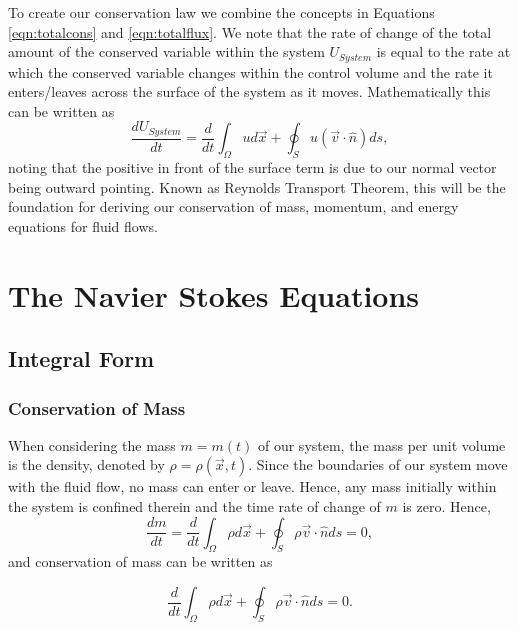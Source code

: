 To create our conservation law we combine the concepts in Equations \ref{eqn:totalcons} and \ref{eqn:totalflux}. We note that the rate of change of the total amount of the conserved variable within the system $U_{System}$ is equal to the rate at which the conserved variable changes within the control volume and the rate it enters/leaves across the surface of the system as it moves. Mathematically this can be written as
\begin{equation}
	\frac{dU_{System}}{dt} = \frac{d}{dt}\int_\Omega u d\vec{x} + \oint_S u (\vec{v} \cdot \hat{n}) ds,
\end{equation}
noting that the positive in front of the surface term is due to our normal vector being outward pointing. Known as Reynolds Transport Theorem, this will be the foundation for deriving our conservation of mass, momentum, and energy equations for fluid flows.

\chapter{The Navier Stokes Equations}

\section{Integral Form}
\subsection{Conservation of Mass}
When considering the mass $m = m(t)$ of our system, the mass per unit volume is the density, denoted by $\rho = \rho(\vec{x},t)$. Since the boundaries of our system move with the fluid flow, no mass can enter or leave. Hence, any mass initially within the system is confined therein and the time rate of change of $m$ is zero. Hence,
\begin{equation}
	\frac{dm}{dt} = \frac{d}{dt}\int_\Omega \rho d\vec{x} + \oint_S \rho \vec{v} \cdot \hat{n} ds = 0,
\end{equation}
and conservation of mass can be written as
\begin{eqBox}
\begin{equation}
	\frac{d}{dt}\int_\Omega \rho d\vec{x} + \oint_S \rho \vec{v} \cdot \hat{n} ds = 0.
\end{equation}
\end{eqBox}

